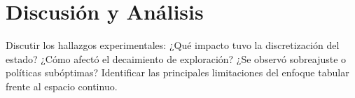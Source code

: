 \section{Discusión y Análisis }
Discutir los hallazgos experimentales: ¿Qué impacto tuvo la discretización del estado? ¿Cómo afectó el decaimiento de exploración? ¿Se observó sobreajuste o políticas subóptimas? Identificar las principales limitaciones del enfoque tabular frente al espacio continuo.